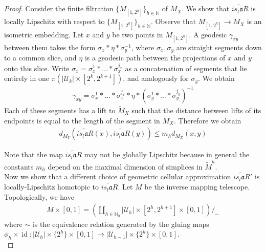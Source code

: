 \documentclass[a4paper,11pt]{article}
\theoremstyle{definition}
\theoremstyle{plain}
\theoremstyle{remark}
\DeclareMathOperator{\id}{id}
\begin{document}
{\begin{proof}
Consider the finite filtration $\{M_{[1,2^{h}]}\}_{h\in \mathbb{N}}$ of $M_{X}$. We show that $\widetilde{is_{l}\mathfrak{a}R}$ is locally Lipschitz with respect to $\{M_{[1,2^{h}]}\}_{h\in \mathbb{N}}$. Observe that $M_{[1,2^{h}]}\rightarrow M_{X}$ is an isometric embedding. Let  $x$ and $y$ be two points in $M_{[1,2^{h}]}$. A geodesic $\gamma_{xy}$ between them takes the form $\sigma_{x}\ast \eta \ast \sigma_{y}^{-1}$, where $\sigma_{x}, \sigma_{y}$ are straight segments down to a common slice, and $\eta$ is a geodesic path between the projections of $x$ and $y$ onto this slice. Write $\sigma_{x}= \sigma^{1}_{x}\ast \dots \ast \sigma^{j_{x}}_{x}$ as a concatenation of segments that lie entirely in one $\pi(|\mathcal{U}_{k}| \times [2^k,2^{k+1}])$, and analogously for $\sigma_{y}$. We obtain 
\begin{align*}
\gamma_{xy} = \sigma^{1}_{x}\ast \dots \ast \sigma^{j_{x}}_{x} \ast \eta \ast (\sigma^{1}_{y}\ast \dots \ast \sigma^{j_{y}}_{y})^{-1}
\end{align*}
Each of these segments has a lift to $\tilde{M}_{X}$ such that the distance between lifts of its endpoints is equal to the length of the segment in $M_{X}$. Therefore we obtain
\begin{align*}
d_{M_{Y}}(\widetilde{is_{l}\mathfrak{a}R}(x), \widetilde{is_{l}\mathfrak{a}R}(y)) \leq m_{h} d_{M_{X}} (x,y)
\end{align*}

Note that the map $\widetilde{is_{l}\mathfrak{a}R}$ may not be globally Lipschitz because in general the constants $m_{h}$ depend on the maximal dimension of simplices in $\tilde{M}^h$. \\

Now we show that a different choice of geometric cellular approximation $\widetilde{is_{l}\mathfrak{a}R}'$ is locally-Lipschitz homotopic to $\widetilde{is_{l}\mathfrak{a}R}$. Let $M$ be the inverse mapping telescope. Topologically, we have 
\begin{align*}
M \times [0,1] = (\coprod_{h\in \mathbb{N}_{0}} |\mathcal{U}_{h}| \times [2^h,2^{h+1}] \times [0,1])/_{\sim}
\end{align*}
where $\sim$ is the equivalence relation generated by the gluing maps $\phi_{h} \times \id: |\mathcal{U}_{h}| \times \{2^h\} \times [0,1]\rightarrow |\mathcal{U}_{h-1}| \times \{2^h\} \times [0,1]$. \\


\end{proof}}
\end{document}
